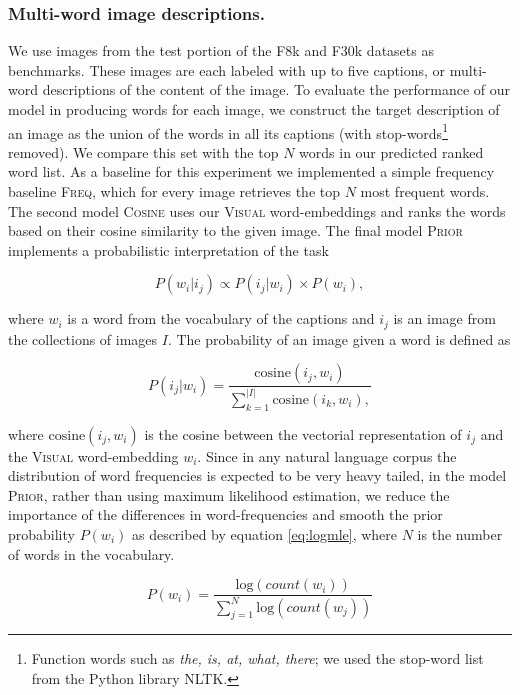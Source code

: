 \subsubsection{Multi-word image descriptions.}
We use images from the test portion of the F8k and F30k datasets as
benchmarks. These images are each labeled with up to five captions, or
multi-word descriptions of the content of the image. To evaluate the
performance of our model in producing words for each image, we
construct the target description of an image as the union of the words
in all its captions \label{rev:stopword}
(with stop-words\footnote{Function words such as \emph{the, is, at, what, there};
we used the stop-word list from the Python library NLTK.} removed). We compare this set
with the top $N$ words in our predicted ranked word list.
As a baseline for this experiment we implemented a simple frequency baseline
\textsc{Freq}, which for every image retrieves the top $N$ most frequent words.
The second model \textsc{Cosine} uses our \textsc{Visual} word-embeddings
and ranks the words based on their cosine similarity to the given image.
The final model \textsc{Prior} implements a probabilistic interpretation of the task

\begin{equation}
\label{eq:proba}
P(w_{i}|i_{j}) \propto P(i_{j}|w_{i})\times{P(w_{i}),}
\end{equation}

where $w_{i}$ is a word from the vocabulary of the captions and
$i_{j}$ is an image from the collections of images $I$. The probability of an
image given a word is defined as

\begin{equation}
\label{eq:likelihood}
P(i_{j}|w_{i}) = \frac{\mathrm{cosine}(i_{j}, w_{i})} {\sum_{k=1}^{\left\vert{I}\right\vert} \mathrm{cosine}(i_{k}, w_{i}),}
\end{equation}

where $\mathrm{cosine}(i_{j}, w_{i})$ is the cosine between the vectorial representation of $i_{j}$
and the \textsc{Visual} word-embedding $w_{i}$. Since in any natural language corpus the distribution of word frequencies is expected to be very heavy tailed, in the model \textsc{Prior}, rather than using maximum likelihood estimation, we reduce the importance of the differences in word-frequencies and smooth the prior probability $P(w_{i})$ as described by equation \ref{eq:logmle}, where $N$ is the number of words in the vocabulary.

\begin{equation}
\label{eq:logmle}
P(w_{i}) = \frac{\mathrm{log}(\mathit{count}(w_{i}))}{\sum_{j=1}^N\mathrm{log}(\mathit{count}(w_{j}))}
\end{equation}

